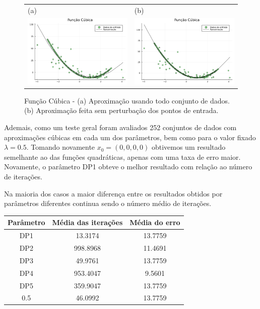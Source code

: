 \documentclass[12pt,a4paper]{article}
\begin{document}
	\begin{figure}[H]
		\centering 
		\begin{tabular}{ll}
			
			(a)& (b)   \\
			
			\includegraphics[width=0.45\linewidth]{3.png} & \includegraphics[width=0.45\linewidth]{4.png}\\ 
			
		\end{tabular}
		\caption{Função Cúbica - (a) Aproximação usando todo conjunto de dados. (b) Aproximação feita sem perturbação dos pontos de entrada.}
		\label{fig2}
	\end{figure}
	
	
	Ademais, como um teste geral foram avaliados 252 conjuntos de dados com aproximações cúbicas em cada um dos parâmetros, bem como para o valor fixado $\lambda = 0.5.$ Tomando novamente $x_0 = (0, 0, 0, 0)$ obtivemos um resultado semelhante ao das funções quadráticas, apenas com uma taxa de erro maior. Novamente, o parâmetro DP1 obteve o melhor resultado com relação ao número de iterações.
	
	Na maioria dos casos a maior diferença entre os resultados obtidos por parâmetros diferentes continua sendo o número médio de iterações.
	
	\begin{table}[H]
		\centering
		\begin{tabular}{|c|c|c|}
			\hline
			Parâmetro & Média das iterações & Média do erro\\
			\hline
			
			DP1 & 13.3174 & 13.7759\\
			\hline
			DP2 & 998.8968 & 11.4691\\ \hline
			DP3 & 49.9761 & 13.7759\\ \hline
			DP4 & 953.4047 & 9.5601\\ \hline
			DP5 & 359.9047 & 13.7759\\ \hline
			0.5 & 46.0992 & 13.7759\\		\hline	
			
		\end{tabular}
	\end{table}
\end{document}
